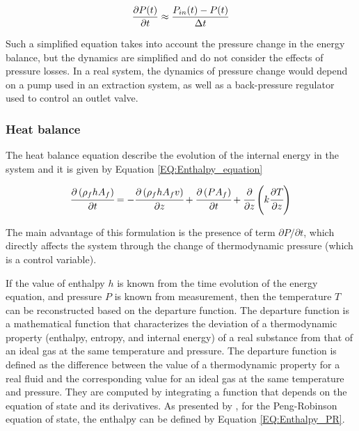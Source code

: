 \documentclass[../Article_Model_Parameters.tex]{subfiles}
\begin{document}
			{\footnotesize
				\begin{equation}
					\frac{\partial {\color{black}P}(t)}{\partial t} \approx \frac{{\color{black}P_{in}}(t) - {\color{black}P}(t) }{\Delta t}
			\end{equation}}
			
			Such a simplified equation takes into account the pressure change in the energy balance, but the dynamics are simplified and do not consider the effects of pressure losses. In a real system, the dynamics of pressure change would depend on a pump used in an extraction system, as well as a back-pressure regulator used to control an outlet valve.
						
			\subsubsection{Heat balance} \label{CH: heat_balance}
			
			The heat balance equation describe the evolution of the internal energy in the system and it is given by Equation \ref{EQ:Enthalpy_equation}
			
			{\footnotesize
				\begin{equation} \label{EQ:Enthalpy_equation}
					\cfrac{\partial \left(\rho_f {\color{black}h} A_f\right)}{\partial t} = - \cfrac{\partial \left( \rho_f {\color{black}h} A_f v \right)}{\partial z} + \cfrac{\partial \left(P A_f\right)}{\partial t} + \cfrac{\partial}{\partial z} \left( k \cfrac{\partial T}{\partial z} \right)
				\end{equation}
			}
			
			The main advantage of this formulation is the presence of term $\partial P / \partial t $, which directly affects the system through the change of thermodynamic pressure (which is a control variable). %
			
			If the value of enthalpy $h$ is known from the time evolution of the energy equation, and pressure $P$ is known from measurement, then the temperature $T$ can be reconstructed based on the departure function. The departure function is a mathematical function that characterizes the deviation of a thermodynamic property (enthalpy, entropy, and internal energy) of a real substance from that of an ideal gas at the same temperature and pressure. The departure function is defined as the difference between the value of a thermodynamic property for a real fluid and the corresponding value for an ideal gas at the same temperature and pressure. They are computed by integrating a function that depends on the equation of state and its derivatives. As presented by \citet{Gmehling2019}, for the Peng-Robinson equation of state, the enthalpy can be defined by Equation \ref{EQ:Enthalpy_PR}.
			
\end{document}
